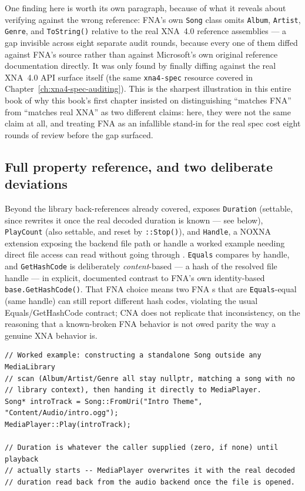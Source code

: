 One finding here is worth its own paragraph, because of what it reveals about verifying
against the wrong reference: FNA's own \texttt{Song} class omits \texttt{Album},
\texttt{Artist}, \texttt{Genre}, and \texttt{ToString()} relative to the real XNA~4.0
reference assemblies --- a gap invisible across eight separate audit rounds, because every
one of them diffed against FNA's source rather than against Microsoft's own original
reference documentation directly. It was only found by finally diffing against the real
XNA~4.0 API surface itself (the same \texttt{xna4-spec} resource covered in
Chapter~\ref{ch:xna4-spec-auditing}). This is the sharpest illustration in this entire book of
why this book's first chapter insisted on distinguishing ``matches FNA'' from ``matches real
XNA'' as two different claims: here, they were not the same claim at all, and treating FNA as
an infallible stand-in for the real spec cost eight rounds of review before the gap surfaced.

\subsection{Full property reference, and two deliberate deviations}

Beyond the library back-references already covered,  exposes
\texttt{Duration} (settable, since  rewrites it once the real decoded
duration is known --- see below), \texttt{PlayCount} (also settable, and reset by
\texttt{::Stop()}), and \texttt{Handle}, a NOXNA extension exposing the
backend file path or handle a worked example needing direct file access can read without
going through . \texttt{Equals} compares by handle, and
\texttt{GetHashCode} is deliberately \emph{content}-based --- a hash of the resolved file
handle --- in explicit, documented contrast to FNA's own identity-based
\texttt{base.GetHashCode()}. That FNA choice means two FNA s that are
\texttt{Equals}-equal (same handle) can still report different hash codes, violating the usual
Equals/GetHashCode contract; CNA does not replicate that inconsistency, on the reasoning that a
known-broken FNA behavior is not owed parity the way a genuine XNA behavior is.

\begin{lstlisting}
// Worked example: constructing a standalone Song outside any MediaLibrary
// scan (Album/Artist/Genre all stay nullptr, matching a song with no
// library context), then handing it directly to MediaPlayer.
Song* introTrack = Song::FromUri("Intro Theme", "Content/Audio/intro.ogg");
MediaPlayer::Play(introTrack);

// Duration is whatever the caller supplied (zero, if none) until playback
// actually starts -- MediaPlayer overwrites it with the real decoded
// duration read back from the audio backend once the file is opened.
\end{lstlisting}

